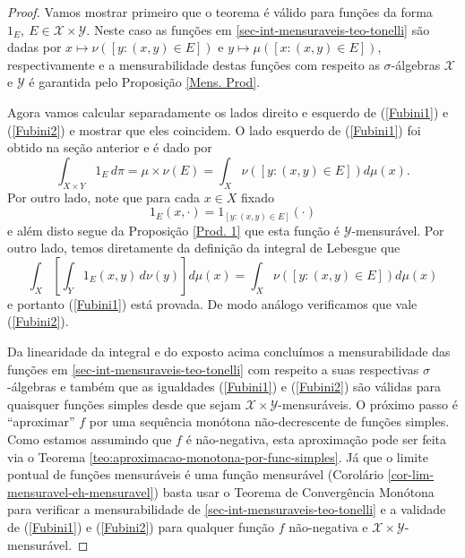\begin{proof}
Vamos mostrar primeiro que o teorema é válido para funções da forma 
$1_E,~E\in \mathscr{X}\times \mathscr{Y}$. 
Neste caso as funções em \eqref{sec-int-mensuraveis-teo-tonelli}
são dadas por $x\mapsto \nu([y:(x,y)\in E])$ e 
$y\mapsto \mu([x:(x,y)\in E])$, respectivamente e a mensurabilidade destas 
funções com respeito as $\sigma$-álgebras $\mathscr{X}$ e $\mathscr{Y}$
é garantida pelo Proposição \ref{Mens. Prod}.

Agora vamos calcular separadamente os lados direito e esquerdo de
(\ref{Fubini1}) e (\ref{Fubini2}) e mostrar que eles coincidem.
O lado esquerdo de (\ref{Fubini1}) foi obtido na seção anterior 
e é dado por
\begin{equation}
\int_{X\times Y} 1_E\, d\pi 
=
\mu\times \nu( E)
=
\int_X \nu([y:(x,y)\in E]) d\mu(x).
\end{equation}
Por outro lado, note que para cada $x\in X$ fixado 
\[ 
1_E(x,\cdot) 
=
1_{[y:(x,y)\in E]}(\cdot)
\]
e além disto segue da Proposição \ref{Prod. 1} 
que esta função é $\mathscr{Y}$-mensurável. 
Por outro lado, temos diretamente da definição 
da integral de Lebesgue que
\begin{equation}
\int_X
\left[ \int_Y 1_E(x,y)\, d\nu(y)\right] d\mu(x)
= 
\int_X \nu([y:(x,y)\in E]) d\mu(x)
\end{equation}
e portanto (\ref{Fubini1}) está provada. 
De modo análogo verificamos que vale (\ref{Fubini2}). 

Da linearidade da integral e do exposto acima 
concluímos a mensurabilidade das funções em
\eqref{sec-int-mensuraveis-teo-tonelli} com
respeito a suas respectivas $\sigma$-álgebras
e também que as igualdades (\ref{Fubini1}) e (\ref{Fubini2})  
são válidas para quaisquer funções simples desde que 
sejam $\mathscr{X}\times\mathscr{Y}$-mensuráveis. 
O próximo passo é ``aproximar'' $f$ por uma sequência
monótona não-decrescente de funções simples. 
Como estamos assumindo que $f$ é não-negativa, 
esta aproximação pode ser feita 
via o Teorema \eqref{teo:aproximacao-monotona-por-func-simples}.
Já que o limite pontual de funções mensuráveis é uma 
função mensurável 
(Corolário \ref{cor-lim-mensuravel-eh-mensuravel})
basta usar o Teorema de Convergência Monótona 
para verificar a mensurabilidade de \ref{sec-int-mensuraveis-teo-tonelli}
e a validade de (\ref{Fubini1}) e (\ref{Fubini2}) 
para qualquer função $f$ não-negativa e 
$\mathscr{X}\times\mathscr{Y}$-mensurável.
\end{proof}





